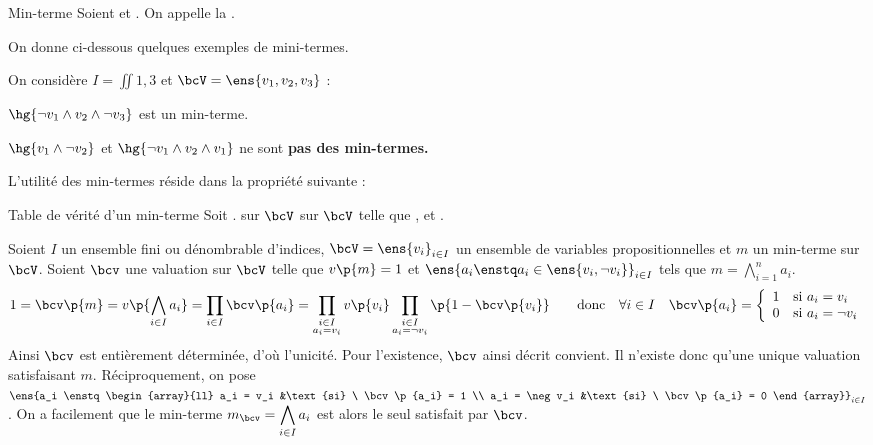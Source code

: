     
    
    
    
    
    \begin{definition}{Min-terme}{}
        Soient  et . On appelle  la .
    \end{definition}
    On donne ci-dessous quelques exemples de mini-termes.
    \begin{example}{}{}
        On considère $I = \iint{1, 3}$ et $\bcV = \ens{v_1, v_2, v_3}$ :
        \begin{enumerate}
            \itt $\hg{\neg v_1 \land v_2 \land \neg v_3}$ est un min-terme.
            
            \itt $\hg{v_1 \land \neg v_2}$ et $\hg{\neg v_1 \land v_2 \land v_1}$ ne sont \bf{pas} des min-termes.
        \end{enumerate}
    \end{example}
    L'utilité des min-termes réside dans la propriété suivante :
    \begin{property}{Table de vérité d'un min-terme}{}
        Soit .  sur $\bcV$  sur $\bcV$ telle que , et .
    \end{property}
    \begin{nproof}
        Soient $I$ un ensemble fini ou dénombrable d'indices, $\bcV = \ens{v_i}_{i \in I}$ un ensemble de variables propositionnelles et $m$ un min-terme sur $\bcV$. Soient $\bcv$ une valuation sur $\bcV$ telle que $v\p{m} = 1$ et $\ens{a_i \enstq a_i \in \ens{v_i, \neg v_i}}_{i \in I}$ tels que $m = \displaystyle\bigwedge_{i=1}^n a_i$.
        \[ 1 = \bcv\p{m} = v\p{\bigwedge_{i \in I} a_i} = \prod_{i \in I} \bcv\p{a_i} = \prod_{\substack{i \in I\\a_i = v_i}} v\p{v_i} \prod_{\substack{i \in I\\a_i = \neg v_i}} \p{1 - \bcv\p{v_i}} \qquad\text{donc}\quad \forall i \in I\quad \bcv\p{a_i} = \left\lbrace\begin{array}{ll}
            1 &\text{si} \ a_i = v_i  \\
            0 &\text{si} \ a_i = \neg v_i 
        \end{array}\right.\]
        Ainsi $\bcv$ est entièrement déterminée, d'où l'unicité. Pour l'existence, $\bcv$ ainsi décrit convient. Il n'existe donc qu'une unique valuation satisfaisant $m$. Réciproquement, on pose $\ens{a_i \enstq \begin{array}{ll}
            a_i = v_i &\text{si} \ \bcv\p{a_i} = 1  \\
            a_i = \neg v_i &\text{si} \ \bcv\p{a_i} = 0 
        \end{array}}_{i \in I}$. On a facilement que le min-terme $m_\bcv = \displaystyle\bigwedge_{i \in I} a_i$ est alors le seul satisfait par $\bcv$. 
    \end{nproof}
